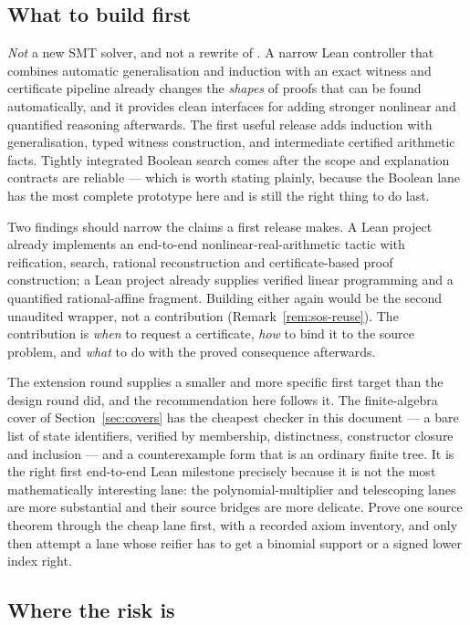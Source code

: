 \subsection{What to build first}

\emph{Not} a new SMT solver, and not a rewrite of \grind{}. A narrow Lean
controller that combines automatic generalisation and induction with an exact
witness and certificate pipeline already changes the \emph{shapes} of proofs
that can be found automatically, and it provides clean interfaces for adding
stronger nonlinear and quantified reasoning afterwards. The first useful release
adds induction with generalisation, typed witness construction, and intermediate
certified arithmetic facts. Tightly integrated Boolean search comes after the
scope and explanation contracts are reliable --- which is worth stating plainly,
because the Boolean lane has the most complete prototype here and is still the
right thing to do last.

Two findings should narrow the claims a first release makes. A Lean 
project already implements an end-to-end nonlinear-real-arithmetic tactic with
reification, search, rational reconstruction and certificate-based proof
construction; a Lean  project already supplies verified linear
programming and a quantified rational-affine fragment. Building either again
would be the second unaudited wrapper, not a contribution
(Remark~\ref{rem:sos-reuse}). The contribution is \emph{when} to request a
certificate, \emph{how} to bind it to the source problem, and \emph{what} to do
with the proved consequence afterwards.

The extension round supplies a smaller and more specific first target than the
design round did, and the recommendation here follows it. The finite-algebra
cover of Section~\ref{sec:covers} has the cheapest checker in this document ---
a bare list of state identifiers, verified by membership, distinctness,
constructor closure and inclusion --- and a counterexample form that is an
ordinary finite tree. It is the right first end-to-end Lean milestone precisely
because it is not the most mathematically interesting lane: the
polynomial-multiplier and telescoping lanes are more substantial and their
source bridges are more delicate. Prove one source theorem through the cheap
lane first, with a recorded axiom inventory, and only then attempt a lane whose
reifier has to get a binomial support or a signed lower index right.

\subsection{Where the risk is}

